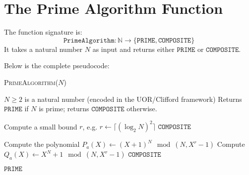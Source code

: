 \documentclass[11pt]{article}
\begin{document}
\section*{The Prime Algorithm Function}

The function signature is:
\[
\texttt{PrimeAlgorithm} : \mathbb{N} \to \{\mathtt{PRIME},\mathtt{COMPOSITE}\}
\]
It takes a natural number \(N\) as input and returns either \(\mathtt{PRIME}\) or \(\mathtt{COMPOSITE}\).

Below is the complete pseudocode:

\begin{algorithm}
\caption{\textsc{PrimeAlgorithm}(\(N\))}
\begin{algorithmic}[1]
\Require \(N \ge 2\) is a natural number (encoded in the UOR/Clifford framework)
\Ensure Returns \(\mathtt{PRIME}\) if \(N\) is prime; returns \(\mathtt{COMPOSITE}\) otherwise.

\State Compute a small bound \(r\), e.g. \(r \gets \lceil (\log_2 N)^2 \rceil\)
        \State \Return \(\mathtt{COMPOSITE}\) 
    \EndIf
\EndFor

    \State Compute the polynomial \(P_a(X) \gets (X+1)^N \mod (N, X^r-1)\)
    \State Compute \(Q_a(X) \gets X^N + 1 \mod (N, X^r-1)\)
        \State \Return \(\mathtt{COMPOSITE}\) 
    \EndIf
\EndFor

\State \Return \(\mathtt{PRIME}\)
\end{algorithmic}
\end{algorithm}
\end{document}
